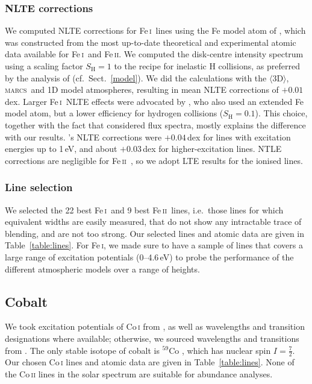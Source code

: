 \documentclass[traditabstract]{aa}
\newcommand{\oneDAV}{$\langle\mathrm{3D}\rangle$}
\newcommand{\marcs}{\textsc{marcs}}
\newcommand{\altfei}{Fe\,\textsc{i}}
\newcommand{\altfeii}{Fe\,\textsc{ii}}
\newcommand{\fei}{\altfei\ }
\newcommand{\feii}{\altfeii\ }
\begin{document}
\subsubsection{NLTE corrections}
\label{FeNLTE}
We computed NLTE corrections for \fei lines using the Fe model atom of \citet{MB_fe}, which was constructed from the most up-to-date theoretical and experimental atomic data available for \fei and \altfeii. We computed the disk-centre intensity spectrum using a scaling factor $S_\mathrm{H}=1$ to the \citet{Drawin69} recipe for inelastic H collisions, as preferred by the analysis of \citeauthor{MB_fe} (cf.\ Sect.\ \ref{model}). We did the calculations with the \oneDAV , \marcs\ and  1D model atmospheres, resulting in mean NLTE corrections of $+0.01$\,dex.  Larger \fei NLTE effects were advocated by \citet{2011A&A...528A..87M}, who also used an extended Fe model atom, but a lower efficiency for hydrogen collisions ($S_\mathrm{H}=0.1$).  This choice, together with the fact that \citet{2011A&A...528A..87M} considered flux spectra, mostly explains the difference with our results. \citeauthor{2011A&A...528A..87M}'s NLTE corrections were $+0.04$\,dex for lines with excitation energies up to 1\,eV, and about $+0.03$\,dex for higher-excitation lines.  NTLE corrections are negligible for \feii \citep{MB_fe}, so we adopt LTE results for the ionised lines.


\subsubsection{Line selection}
\label{Felineselection}

We selected the 22 best \fei and 9 best \feii lines, i.e.~those lines for which equivalent widths are easily measured, that do not show any intractable trace of blending, and are not too strong. Our selected lines and atomic data are given in Table~\ref{table:lines}. For Fe\,\textsc{i}, we made sure to have a sample of lines that covers a large range of excitation potentials (0--4.6\,eV) to probe the performance of the different atmospheric models over a range of heights.


\subsection{Cobalt}
\label{Coatomicdata}

We took excitation potentials of Co\,\textsc{i} from \citet{Pickering96b}, as well as wavelengths and transition designations where available; otherwise, we sourced wavelengths and transitions from \citet{Cardon82}.  The only stable isotope of cobalt is $^{59}$Co \citep{IUPAC98}, which has nuclear spin $I=\frac{7}{2}$.  Our chosen Co\,\textsc{i} lines and atomic data are given in Table~\ref{table:lines}.  None of the Co\,\textsc{ii} lines in the solar spectrum are suitable for abundance analyses.
\end{document}
